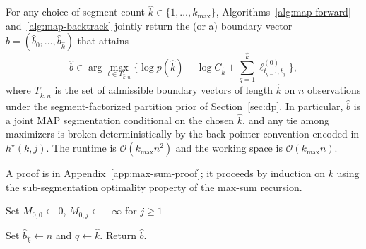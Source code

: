 \begin{theorem}
\label{thm:map-correctness}
For any choice of segment count $\widehat k\in\{1,\dots,k_{\max}\}$, Algorithms~\ref{alg:map-forward}
and~\ref{alg:map-backtrack} jointly return the (or a) boundary vector
$\widehat b=(\widehat b_0,\dots,\widehat b_{\widehat k})$ that attains
\[
\widehat b \in \arg\max_{t\in T_{\widehat k,n}}\Big\{
   \log p(\widehat k) - \log C_{\widehat k} + \sum_{q=1}^{\widehat k} \ell^{(0)}_{t_{q-1},t_q}
\Big\},
\]
where $T_{\widehat k,n}$ is the set of admissible boundary vectors of length $\widehat k$ on $n$
observations under the segment-factorized partition prior of Section~\ref{sec:dp}. In particular,
$\widehat b$ is a joint MAP segmentation conditional on the chosen $\widehat k$, and any tie among
maximizers is broken deterministically by the back-pointer convention encoded in
$h^\star(k,j)$. The runtime is $\mathcal{O}(k_{\max}n^2)$ and the working space is
$\mathcal{O}(k_{\max}n)$.
\end{theorem}

A proof is in Appendix~\ref{app:max-sum-proof}; it proceeds by induction on $k$ using the
sub-segmentation optimality property of the max-sum recursion.

\begin{algorithm}[H]
\caption{MAPForward$(\ell^{(0)}_{ij},k_{\max})$}
\label{alg:map-forward}
\BlankLine
Set $M_{0,0}\leftarrow 0$, $M_{0,j}\leftarrow -\infty$ for $j\ge 1$\;
\end{algorithm}

\begin{algorithm}[H]
\caption{MAPBacktrack$(h^\star,\widehat{k})$}
\label{alg:map-backtrack}
\BlankLine
Set $\widehat{b}_{\widehat{k}}\leftarrow n$ and $q\leftarrow\widehat{k}$.
Return $\widehat{b}$.
\end{algorithm}

